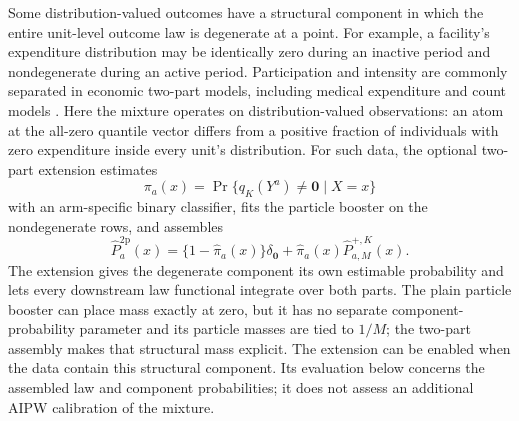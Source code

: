 \documentclass[11pt]{article}
\begin{document}
Some distribution-valued outcomes have a structural component in which the
entire unit-level outcome law is degenerate at a point. For example, a facility's expenditure distribution may be identically zero during an inactive period and nondegenerate during an active period. Participation and intensity are commonly separated in economic two-part models, including medical expenditure and count models \citep{duan1983medical,mullahy1986modified}. Here the mixture operates on distribution-valued observations: an atom at the all-zero quantile vector differs from a positive fraction of individuals with zero expenditure inside every unit's distribution. For such data, the optional two-part extension
estimates
\[
 \pi_a(x)=\Pr\{q_K(Y^a)\neq\mathbf{0}\mid X=x\}
\]
with an arm-specific binary classifier, fits the particle booster on the
nondegenerate rows, and assembles
\[
 \widehat P_a^{\mathrm{2p}}(x)=
 \{1-\widehat\pi_a(x)\}\delta_{\mathbf{0}}
 +\widehat\pi_a(x)\widehat P_{a,M}^{+,K}(x).
\]
The extension gives the degenerate component its own estimable probability
and lets every downstream law functional integrate over both parts. The plain
particle booster can place mass exactly at zero, but it has no
separate component-probability parameter and its particle masses are tied to
$1/M$; the two-part assembly makes that structural mass explicit. The extension can be enabled when the data contain this structural component. Its evaluation below concerns the assembled law and component probabilities; it does not assess an additional AIPW calibration of the mixture.
\end{document}
